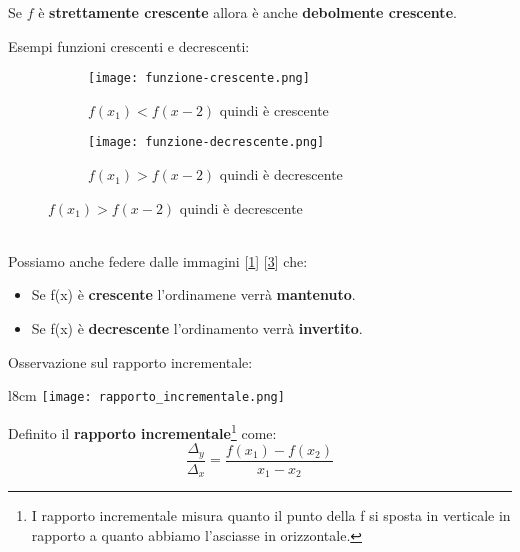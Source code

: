 \begin{observation}
	Se $f$ è \textbf{strettamente crescente} allora è anche \textbf{debolmente crescente}.
\end{observation}
\begin{example}
    Esempi funzioni crescenti e decrescenti:\\
    \begin{figure}[h!]
        \begin{subfigure}{.5\textwidth}
            \centering
            \texttt{[image: funzione-crescente.png]}
            \caption{$f(x_1) < f(x-2)$ quindi è crescente}
            \label{fig:funzione-crescente}
        \end{subfigure}
        \begin{subfigure}{.5\textwidth}
            \centering
            \texttt{[image: funzione-decrescente.png]}
            \caption{$f(x_1) > f(x-2)$ quindi è decrescente}
            \label{fig:funzione-decrescente}
        \end{subfigure}
    \end{figure}
    \\Possiamo anche federe dalle immagini [\ref{fig:funzione-crescente}] [\ref{fig:funzione-decrescente}] che:
    \begin{itemize}
        \item Se f(x) è \textbf{crescente} l'ordinamene verrà \textbf{mantenuto}.
        \item Se f(x) è \textbf{decrescente} l'ordinamento verrà \textbf{invertito}.\\
    \end{itemize}
\end{example}

\newpage
\begin{observation}
    Osservazione sul rapporto incrementale:\\
\end{observation}
\begin{wrapfigure}[8]{l}{8cm}
    \vspace{-15pt}
    \centering
    \texttt{[image: rapporto\_incrementale.png]}
    \caption{$\frac{\Delta_y}{\Delta_x}$}
    \label{fig:esempio-invertibilità}
\end{wrapfigure}
Definito il \textbf{rapporto incrementale}\footnote{I rapporto incrementale misura quanto il punto della f si sposta in verticale in rapporto a quanto abbiamo l'asciasse in orizzontale.} come:
\begin{equation}
    \frac{\Delta_y}{\Delta_x}=\frac{f(x_1) - f(x_2)}{x_1 - x_2}
\end{equation}

